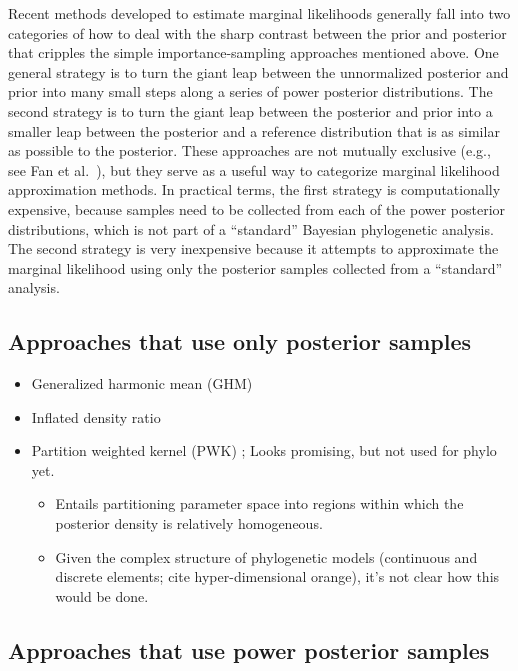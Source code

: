 Recent methods developed to estimate marginal likelihoods generally fall into
two categories of how to deal with the sharp contrast between the prior
and posterior that cripples the simple importance-sampling approaches
mentioned above.
One general strategy is to turn the giant leap between the unnormalized
posterior and prior into many small steps along a series of power posterior
distributions.
The second strategy is to turn the giant leap between the posterior and prior
into a smaller leap between the posterior and a reference distribution that is
as similar as possible to the posterior.
These approaches are not mutually exclusive (e.g., see Fan et al.\
\citeyear{Fan2011}), but they serve as a useful way to categorize marginal
likelihood approximation methods.
In practical terms, the first strategy is computationally expensive, because
samples need to be collected from each of the power posterior distributions,
which is not part of a ``standard'' Bayesian phylogenetic analysis.
The second strategy is very inexpensive because it attempts to approximate the
marginal likelihood using only the posterior samples collected from a
``standard'' analysis.

\subsection{Approaches that use only posterior samples}

\begin{itemize}
    \item Generalized harmonic mean (GHM) \citep{Gelfand1994}
    \item Inflated density ratio \citep{Arima2012}
    \item Partition weighted kernel (PWK) \cite{Wang2017}; Looks promising, but
        not used for phylo yet.
        \begin{itemize}
            \item Entails partitioning parameter space into regions within which the
                posterior density is relatively homogeneous.
            \item Given the complex structure of phylogenetic models
                (continuous and discrete elements; cite hyper-dimensional
                orange), it's not clear how this would be done.
        \end{itemize}
\end{itemize}

\subsection{Approaches that use power posterior samples}

